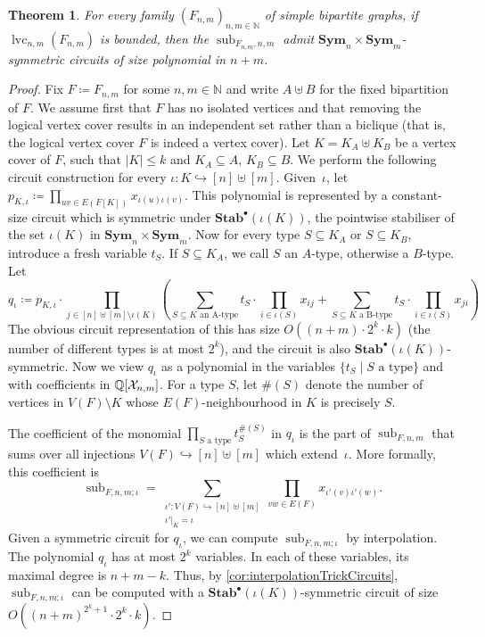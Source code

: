 \documentclass[10pt,a4paper]{article}
\theoremstyle{definition}
\theoremstyle{plain}
\newtheorem{theorem}[definition]{Theorem}
\theoremstyle{remark}
\newcommand{\Xx}{{\cal X}}
\DeclareMathOperator{\sub}{sub}
\DeclareMathOperator{\cc}{lvc}
\newcommand{\Sym}{\mathbf{Sym}}
\newcommand{\Stab}{\mathbf{Stab}}
\newcommand{\StabP}{\Stab^{\bullet}}
\newcommand{\bbQ}{\mathbb{Q}}
\begin{document}
	\begin{theorem}\label{thm:sub-small-circuit}
		For every family  $(F_{n,m})_{n,m \in \mathbb{N}}$ of simple bipartite graphs,
		if $\cc_{n,m}(F_{n,m})$ is bounded,
		then the $\sub_{F_{n,m}, n,m}$ admit  $\Sym_n \times \Sym_m$-symmetric circuits of size polynomial in $n+m$.
	\end{theorem}
	\begin{proof}
		Fix $F \coloneqq F_{n,m}$ for some $n,m \in \mathbb{N}$ and write $A \uplus B$ for the fixed bipartition of $F$.
		We assume first that $F$ has no isolated vertices and that removing the logical vertex cover results in an independent set rather than a biclique (that is, the logical vertex cover $F$ is indeed a vertex cover).
		Let $K = K_A \uplus K_B$ be a vertex cover of $F$, such that $|K| \leq k$ and $K_A \subseteq A$, $K_B \subseteq B$. We perform the following circuit construction for every $\iota\colon K \hookrightarrow [n] \uplus [m]$. 
		Given~$\iota$, let $p_{K,\iota} \coloneqq \prod_{uv \in E(F[K])} x_{\iota(u)\iota(v)}$. 
		This polynomial is represented by a constant-size circuit which is symmetric under $\StabP(\iota(K))$, the pointwise stabiliser of the set $\iota(K)$ in $\Sym_n \times \Sym_m$.
		Now for every type $S \subseteq K_A$ or $S \subseteq K_B$, introduce a fresh variable $t_S$. If $S \subseteq K_A$, we call $S$ an $A$-type, otherwise a $B$-type. Let
		\[
		q_{\iota} \coloneqq p_{K,\iota} \cdot \prod_{j \in [n] \uplus [m] \setminus \iota(K)} \left( \sum_{S \subseteq K \text{ an A-type} } t_S \cdot \prod_{i \in \iota(S)} x_{ij} + \sum_{S \subseteq K \text{ a B-type} }  t_S \cdot \prod_{i \in \iota(S)} x_{ji}\right)
		\]
		The obvious circuit representation of this has size $O((n+m) \cdot 2^k \cdot k)$ (the number of different types is at most $2^k$), and the circuit is also $\StabP(\iota(K))$-symmetric.
		Now we view $q_{\iota}$ as a polynomial in the variables $\{t_S \mid S \text{ a type} \}$ and with coefficients in $\bbQ[\Xx_{n,m}]$.
		For a type $S$, let $\#(S)$ denote the number of vertices in $V(F) \setminus K$ whose $E(F)$-neighbourhood in $K$ is precisely $S$.
		
		The coefficient of the monomial $\prod_{S \text{ a type}} t^{\#(S)}_S$ in $q_{\iota}$ is the part of $\sub_{F,n,m}$ that sums over all injections $V(F) \hookrightarrow [n] \uplus [m]$ which extend~$\iota$. More formally, this coefficient is
		\[
		\sub_{F,n,m;\iota} = \sum_{\substack{\iota' \colon V(F) \hookrightarrow [n] \uplus [m] \\ \iota'|_K = \iota}} \prod_{vw \in E(F)} x_{\iota'(v)\iota'(w)} .
		\]
		Given a symmetric circuit for $q_{\iota}$, we can compute $\sub_{F,n,m;\iota}$ by interpolation. 
		The polynomial $q_\iota$ has at most $2^k$ variables.
		In each of these variables, its maximal degree is $n+m-k$.
		Thus, by \cref{cor:interpolationTrickCircuits}, $\sub_{F,n,m;\iota}$ can be computed with a $\StabP(\iota(K))$-symmetric circuit of size $O((n+m)^{2^k+1} \cdot 2^k \cdot k)$.
		

\end{proof}
\end{document}
